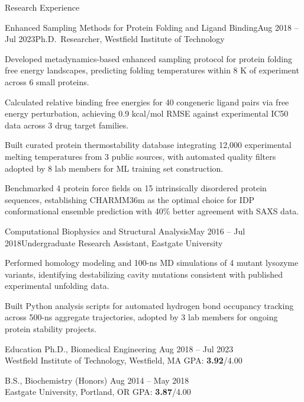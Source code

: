 \documentclass{resume}
\begin{document}
\begin{rSection}{Research Experience}
\begin{rSubsection}{Enhanced Sampling Methods for Protein Folding and Ligand Binding}{\textcolor{black!60}{Aug 2018 -- Jul 2023}}{Ph.D.\ Researcher, Westfield Institute of Technology}{}
\item Developed metadynamics-based enhanced sampling protocol for protein folding free energy landscapes, predicting folding temperatures within 8 K of experiment across 6 small proteins.
\item Calculated relative binding free energies for 40 congeneric ligand pairs via free energy perturbation, achieving 0.9 kcal/mol RMSE against experimental IC50 data across 3 drug target families.
\item Built curated protein thermostability database integrating 12,000 experimental melting temperatures from 3 public sources, with automated quality filters adopted by 8 lab members for ML training set construction.
\item Benchmarked 4 protein force fields on 15 intrinsically disordered protein sequences, establishing CHARMM36m as the optimal choice for IDP conformational ensemble prediction with 40\% better agreement with SAXS data.
\end{rSubsection}

\begin{rSubsection}{Computational Biophysics and Structural Analysis}{\textcolor{black!60}{May 2016 -- Jul 2018}}{Undergraduate Research Assistant, Eastgate University}{}
\item Performed homology modeling and 100-ns MD simulations of 4 mutant lysozyme variants, identifying destabilizing cavity mutations consistent with published experimental unfolding data.
\item Built Python analysis scripts for automated hydrogen bond occupancy tracking across 500-ns aggregate trajectories, adopted by 3 lab members for ongoing protein stability projects.
\end{rSubsection}

\end{rSection}
\vspace{-0.15cm}

\begin{rSection}{Education}
{Ph.D., Biomedical Engineering} \hfill {\textcolor{black!60}{Aug 2018 -- Jul 2023}}\\
{Westfield Institute of Technology}, Westfield, MA \hfill GPA: \textbf{3.92}/4.00

{B.S., Biochemistry (Honors)} \hfill {\textcolor{black!60}{Aug 2014 -- May 2018}}\\
{Eastgate University}, Portland, OR \hfill GPA: \textbf{3.87}/4.00
\end{rSection}
\vspace{-0.15cm}
\end{document}
